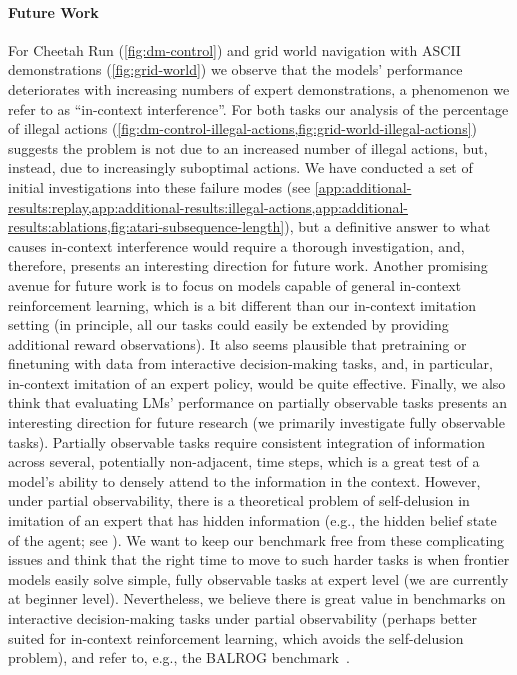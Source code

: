 \documentclass{article}
\newcommand{\eg}{e.g., }
\begin{document}
\paragraph{Future Work}
For Cheetah Run (\cref{fig:dm-control}) and grid world navigation with ASCII demonstrations (\cref{fig:grid-world}) we observe that the models' performance deteriorates with increasing numbers of expert demonstrations, a phenomenon we refer to as ``in-context interference''.
For both tasks our analysis of the percentage of illegal actions (\cref{fig:dm-control-illegal-actions,fig:grid-world-illegal-actions}) suggests the problem is not due to an increased number of illegal actions, but, instead, due to increasingly suboptimal actions.
We have conducted a set of initial investigations into these failure modes (see \cref{app:additional-results:replay,app:additional-results:illegal-actions,app:additional-results:ablations,fig:atari-subsequence-length}), but
a definitive answer to what causes in-context interference would require a thorough investigation, and, therefore, presents an interesting direction for future work.
Another promising avenue for future work is to focus on models capable of general in-context reinforcement learning, which is a bit different than our in-context imitation setting (in principle, all our tasks could easily be extended by providing additional reward observations).
It also seems plausible that pretraining or finetuning with data from interactive decision-making tasks, and, in particular, in-context imitation of an expert policy, would be quite effective.
Finally, we also think that evaluating LMs' performance on partially observable tasks presents an interesting direction for future research (we primarily investigate fully observable tasks).
Partially observable tasks require consistent integration of information across several, potentially non-adjacent, time steps, which is a great test of a model’s ability to densely attend to the information in the context.
However, under partial observability, there is a theoretical problem of self-delusion in imitation of an expert that has hidden information (\eg the hidden belief state of the agent; see \citet{ortega2021shaking}).
We want to keep our benchmark free from these complicating issues and think that the right time to move to such harder tasks is when frontier models easily solve simple, fully observable tasks at expert level (we are currently at beginner level).
Nevertheless, we believe there is great value in benchmarks on interactive decision-making tasks under partial observability (perhaps better suited for in-context reinforcement learning, which avoids the self-delusion problem), and refer to, \eg the BALROG benchmark~\citep{paglieri2025balrog}.
\end{document}

